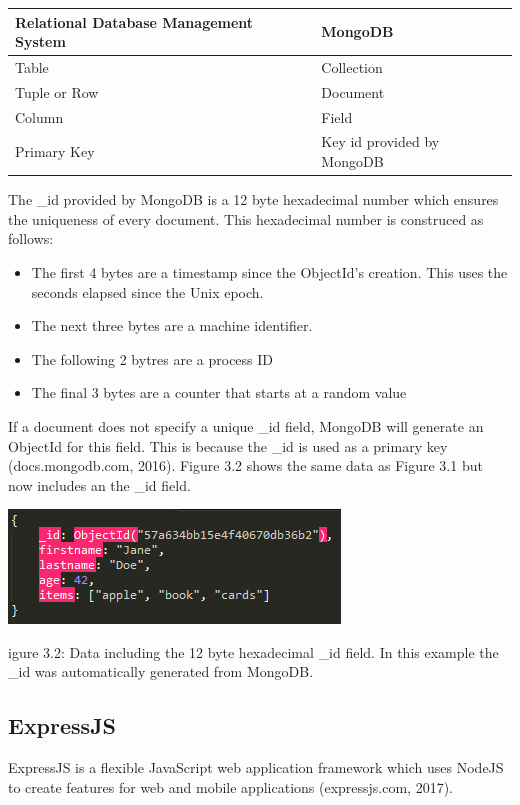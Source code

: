 \documentclass[12pt]{article}
\begin{document}
\begin{center}
    \begin{tabular}{| l | l |}
    \hline
    Relational Database Management System & MongoDB  \\ \hline
    Table & Collection \\ \hline
    Tuple or Row & Document \\ \hline
    Column & Field \\ \hline
    Primary Key & Key id provided by MongoDB \\ \hline
    \end{tabular}
\end{center}

The {\_}id provided by MongoDB is a 12 byte hexadecimal number which ensures the uniqueness of every document. This hexadecimal number is construced as follows:

\begin{itemize}
	\item The first 4 bytes are a timestamp since the ObjectId's creation. This uses the seconds elapsed since the Unix epoch.
	\item The next three bytes are a machine identifier.
	\item The following 2 bytres are a process ID
	\item The final 3 bytes are a counter that starts at a random value
\end{itemize}

If a document does not specify a unique {\_}id field, MongoDB will generate an ObjectId for this field. This is because the {\_}id is used as a primary key (docs.mongodb.com, 2016). Figure 3.2 shows the same data as Figure 3.1 but now includes an the {\_}id field. 

\begin{center}
	\includegraphics[scale=1]{json_id.PNG}
	
	\caption Figure 3.2: Data including the 12 byte hexadecimal {\_}id field. In this example the {\_}id was automatically generated from MongoDB. 
\end{center}

\begin{center}
\subsection{ExpressJS}
\end{center}
ExpressJS is a flexible JavaScript web application framework which uses NodeJS to create features for web and mobile applications (expressjs.com, 2017).
\end{document}
